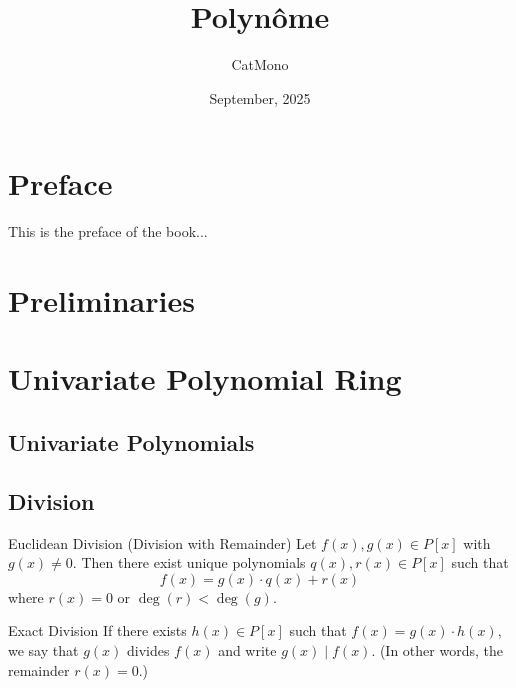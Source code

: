 \documentclass[11pt]{elegantbook}
\title{Polynôme} %
\author{CatMono} %
\date{September, 2025} %
\begin{document}
\maketitle %

\frontmatter        %
\tableofcontents    %

\chapter{Preface}   %
This is the preface of the book...

\mainmatter         %

\chapter{Preliminaries} %


\chapter{Univariate Polynomial Ring}
\section{Univariate Polynomials}

\section{Division}

\begin{theorem}{Euclidean Division (Division with Remainder)}
    Let \( f(x), g(x) \in P[x] \) with \( g(x) \neq 0 \). 
    Then there exist unique polynomials \( q(x), r(x) \in P[x] \) such that
    \[
    f(x) = g(x) \cdot q(x) + r(x)
    \]
    where \( r(x) = 0 \) or \( \deg(r) < \deg(g) \).
\end{theorem}

\begin{definition}{Exact Division}
    If there exists \( h(x)\in P[x] \) such that \( f(x) = g(x) \cdot h(x) \), 
    we say that \( g(x) \) divides \( f(x) \) and write \( g(x) \mid f(x) \).
    (In other words, the remainder \( r(x) = 0 \).)
\end{definition}
\end{document}

